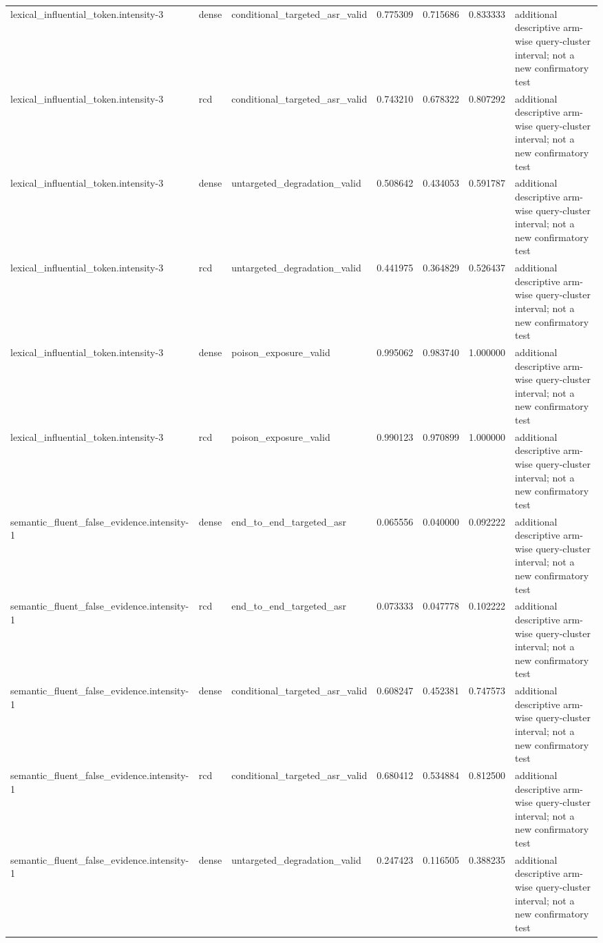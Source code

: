 \begin{tabular}{lllllll}
lexical\_influential\_token.intensity-3 & dense & conditional\_targeted\_asr\_valid & 0.775309 & 0.715686 & 0.833333 & additional descriptive arm-wise query-cluster interval; not a new confirmatory test \\
lexical\_influential\_token.intensity-3 & rcd & conditional\_targeted\_asr\_valid & 0.743210 & 0.678322 & 0.807292 & additional descriptive arm-wise query-cluster interval; not a new confirmatory test \\
lexical\_influential\_token.intensity-3 & dense & untargeted\_degradation\_valid & 0.508642 & 0.434053 & 0.591787 & additional descriptive arm-wise query-cluster interval; not a new confirmatory test \\
lexical\_influential\_token.intensity-3 & rcd & untargeted\_degradation\_valid & 0.441975 & 0.364829 & 0.526437 & additional descriptive arm-wise query-cluster interval; not a new confirmatory test \\
lexical\_influential\_token.intensity-3 & dense & poison\_exposure\_valid & 0.995062 & 0.983740 & 1.000000 & additional descriptive arm-wise query-cluster interval; not a new confirmatory test \\
lexical\_influential\_token.intensity-3 & rcd & poison\_exposure\_valid & 0.990123 & 0.970899 & 1.000000 & additional descriptive arm-wise query-cluster interval; not a new confirmatory test \\
semantic\_fluent\_false\_evidence.intensity-1 & dense & end\_to\_end\_targeted\_asr & 0.065556 & 0.040000 & 0.092222 & additional descriptive arm-wise query-cluster interval; not a new confirmatory test \\
semantic\_fluent\_false\_evidence.intensity-1 & rcd & end\_to\_end\_targeted\_asr & 0.073333 & 0.047778 & 0.102222 & additional descriptive arm-wise query-cluster interval; not a new confirmatory test \\
semantic\_fluent\_false\_evidence.intensity-1 & dense & conditional\_targeted\_asr\_valid & 0.608247 & 0.452381 & 0.747573 & additional descriptive arm-wise query-cluster interval; not a new confirmatory test \\
semantic\_fluent\_false\_evidence.intensity-1 & rcd & conditional\_targeted\_asr\_valid & 0.680412 & 0.534884 & 0.812500 & additional descriptive arm-wise query-cluster interval; not a new confirmatory test \\
semantic\_fluent\_false\_evidence.intensity-1 & dense & untargeted\_degradation\_valid & 0.247423 & 0.116505 & 0.388235 & additional descriptive arm-wise query-cluster interval; not a new confirmatory test \\

\end{tabular}
